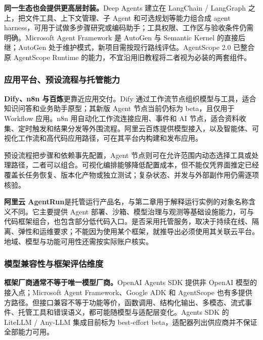 \documentclass[11pt,a4paper]{article}
\begin{document}
\textbf{同一生态也会提供更高层封装。}Deep Agents 建立在 LangChain / LangGraph 之上，把文件工具、上下文管理、子 Agent 和可选规划等能力组合成 agent harness，可用于试做多步骤研究或编码助手；工具权限、工作区与验收条件仍需明确\cite{deepagents}。Microsoft Agent Framework 是 AutoGen 与 Semantic Kernel 的直接后继；AutoGen 处于维护模式，新项目需按现行路线评估\cite{microsoft-agent,autogen-status}。AgentScope 2.0 已整合原 AgentScope Runtime 的能力，不宜沿用旧教程将二者视为必装的两套组件\cite{agentscope-runtime}。

\subsubsection{应用平台、预设流程与托管能力}

\textbf{Dify、n8n 与百炼}更靠近应用交付。Dify 通过工作流节点组织模型与工具，适合知识问答和业务助手原型；其新版 Agent 节点当前仍标为 beta，且仅用于 Workflow 应用\cite{dify-agent}。n8n 用自动化工作流连接应用、事件和 AI 节点，适合资料收集、定时触发和结果分发等外围流程\cite{n8n-ai}。阿里云百炼提供模型接入，以及智能体、可视化工作流和高代码应用路径，可在其平台内构建和发布应用\cite{bailian-apps}。

预设流程把步骤和依赖事先配置，Agent 节点则可在允许范围内动态选择工具或处理路径，二者可以组合。可视化编排能够降低配置成本，但不能仅凭界面推定已经覆盖长任务恢复、版本化产物或独立测试；复杂状态、并发与外部副作用仍需逐项核验。

\textbf{阿里云 AgentRun}是托管运行产品名，与第二章用于解释运行实例的对象名称含义不同。它主要提供 Agent 部署、沙箱、模型治理与观测等基础设施能力，可与代码框架组合，也包含部分低代码入口\cite{agentrun}。是否采用托管服务，取决于持续在线、隔离、弹性和运维要求；不能因为使用某个框架，就推导出必须使用其关联云平台。地域、模型与功能可用性还需按实际账户核实。

\subsubsection{模型兼容性与框架评估维度}

\textbf{框架厂商通常不等于唯一模型厂商。}OpenAI Agents SDK 提供非 OpenAI 模型的接入点；Microsoft Agent Framework、Google ADK 和 AgentScope 也有多提供方路径\cite{agents-models,microsoft-providers,adk-models,agentscope}。但接口兼容不等于功能等价，函数调用、结构化输出、多模态、流式事件、托管工具和错误语义，都可能随模型与适配层变化。Agents SDK 的 LiteLLM / Any-LLM 集成目前标为 best-effort beta，适配器列出供应商并不保证全部能力可用\cite{agents-models}。
\end{document}
